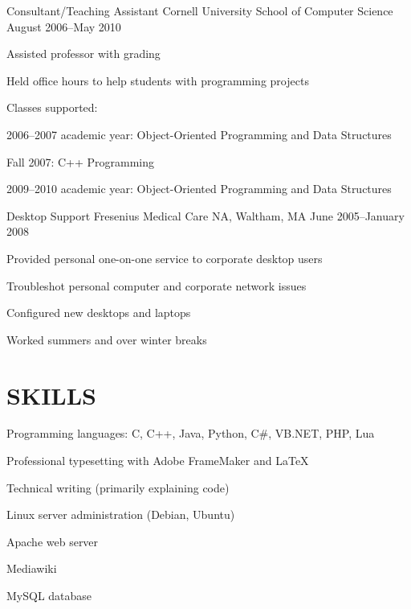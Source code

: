 \documentclass{res}
\begin{document}
\begin{resume}
\affiliation
	{Consultant/Teaching Assistant}
	{Cornell University School of Computer Science}
	{August 2006--May 2010}
	\begin{pos}
	\item Assisted professor with grading
	\item Held office hours to help students with programming
	projects
	\item Classes supported:
		\begin{compactitem}
		\item 2006--2007 academic year: Object-Oriented Programming and Data
		Structures
		\item Fall 2007: C++ Programming
		\item 2009--2010 academic year: Object-Oriented Programming and Data
		Structures
		\end{compactitem}
	\end{pos}

\affiliation
	{Desktop Support}
	{Fresenius Medical Care NA, Waltham, MA}
	{June 2005--January 2008}
	\begin{pos}
	\item Provided personal one-on-one service to corporate desktop users
	\item Troubleshot personal computer and corporate network issues
	\item Configured new desktops and laptops
	\item Worked summers and over winter breaks
	\end{pos}

\section{{\large S}KILLS}
	\vspace{10pt}
	\begin{compactitem}
	\item Programming languages: C, C++, Java, Python, C\#, VB.NET, PHP, Lua
	\item Professional typesetting with Adobe FrameMaker and \LaTeX{}
	\item Technical writing (primarily explaining code)
	\item Linux server administration (Debian, Ubuntu)
		\begin{compactitem}
		\item Apache web server
		\item Mediawiki
		\item MySQL database
		\end{compactitem}
	\end{compactitem}

\end{resume}
\end{document}
